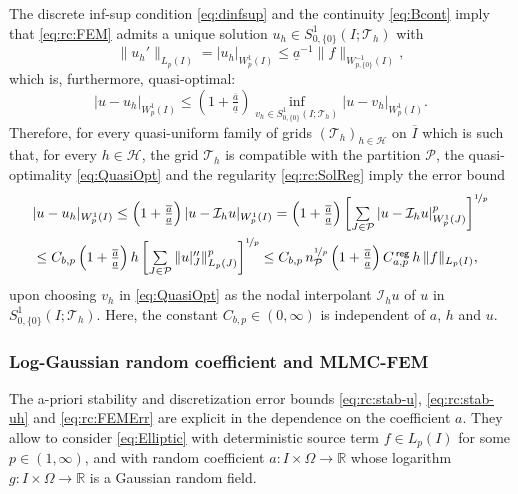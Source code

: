 \documentclass[reqno]{amsart}
\numberwithin{equation}{section}
\newcommand{\bbR}{\mathbb{R}}
\newcommand{\cH}{\mathcal{H}}
\newcommand{\cI}{\mathcal{I}}
\newcommand{\cP}{\mathcal{P}}
\newcommand{\cT}{\mathcal{T}}
\newcommand{\norm}[2]{     \| #1       \|_{ #2 }}
\newcommand{\seminorm}[2]{  | #1        |_{ #2 }}
\newcommand{\from}{\colon}
\theoremstyle{remark}
\theoremstyle{definition}
\begin{document}
The discrete inf-sup condition \eqref{eq:dinfsup} 
and the continuity \eqref{eq:Bcont} 
imply that \eqref{eq:rc:FEM} 
admits a unique solution
$u_h\in  S^1_{0,\{0\}}(I;\cT_h)$ 
with 
% 
\begin{equation}\label{eq:rc:stab-uh} 
\norm{ u_h' }{L_p(I)}
=
\seminorm{ u_h }{W^1_p(I)} 
\leq 
\underline{a}^{-1} 
\norm{ f }{W^{-1}_{p,\{0\}}(I)}, 
\end{equation} 
%
which is, furthermore, quasi-optimal:
%
\begin{equation}\label{eq:QuasiOpt}
\seminorm{ u - u_h }{W^1_p(I)} 
\leq 
\left( 1+\tfrac{\overline{a}}{\underline{a}} \right) 
\inf_{v_h \in S^1_{0,\{0\}}(I;\cT_h)} 
\seminorm{ u - v_h }{W^1_p(I)} . 
\end{equation}
%
Therefore, 
for every quasi-uniform family 
of grids  $(\cT_h)_{h\in\cH}$ on $\overline{I}$ 
which is such that, 
for every $h\in\cH$, 
the grid $\cT_h$ is compatible 
with the partition $\cP$, 
the quasi-optimality \eqref{eq:QuasiOpt} and 
the regularity \eqref{eq:rc:SolReg} 
imply the error bound
%
\begin{align}
&| u - u_h |_{W^1_p(I)} 
\textstyle\leq 
\left( 1+\tfrac{\overline{a}}{\underline{a}} \right) 
\seminorm{ u - \cI_h  u }{W^1_p(I)} 
= 
\left( 1+\tfrac{\overline{a}}{\underline{a}} \right) 
\biggl[ \sum\limits_{J\in\cP}
\seminorm{ u - \cI_h  u }{W^1_p(J)}^p 
\biggr]^{\nicefrac{1}{p}} 
\notag 
\\
&\textstyle 
\leq 
C_{b,p} 
\left( 1+\tfrac{\overline{a}}{\underline{a}} \right) 
h \, 
\biggl[\sum\limits_{J\in \cP} \norm{ u|_J'' }{L_p(J)}^p 
\biggr]^{\nicefrac{1}{p}} 
\leq 
C_{b,p} \, n_\cP^{\nicefrac{1}{p}}
\left( 1+\tfrac{\overline{a}}{\underline{a}} \right) 
C_{a,p}^{\sf \, reg} 
\, 
h 
\, \norm{f}{L_p(I)}	, 
\label{eq:rc:FEMErr}
\end{align}
%
upon choosing $v_h$ in \eqref{eq:QuasiOpt}  
as the nodal interpolant $\cI_h u$ of $u$ 
in $S^1_{0,\{0\}}(I;\cT_h)$. 
Here, the constant $C_{b,p}\in(0,\infty)$ 
is independent of $a$, $h$ and $u$. 

\subsubsection{Log-Gaussian random coefficient and MLMC-FEM} 

The a-priori stability and discretization error bounds 
\eqref{eq:rc:stab-u}, \eqref{eq:rc:stab-uh} and \eqref{eq:rc:FEMErr}
are explicit in 
the dependence on the 
coefficient $a$.
They allow to consider \eqref{eq:Elliptic} with deterministic source 
term $f\in L_p(I)$ for some $p\in(1,\infty)$, 
and with random coefficient 
$a\from I \times \Omega \to \bbR$ 
whose logarithm 
$g\from I \times \Omega \to \bbR$ 
is a Gaussian random field. 
\end{document}
